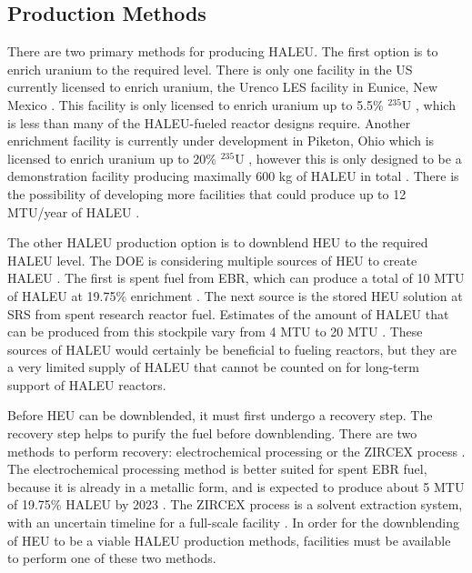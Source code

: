 \subsection{Production Methods}
There are two primary methods for producing \gls{HALEU}. The first 
option is to enrich uranium to the required level. There is only one 
facility in the US currently 
licensed to enrich uranium, the Urenco LES facility in Eunice, 
New Mexico \cite{nuclear_energy_institute_establishing_2022}. This facility is only 
licensed to enrich uranium up to 5.5\% $^{235}$U 
\cite{nuclear_energy_institute_establishing_2022},
which is less than many of the \gls{HALEU}-fueled reactor designs 
require. Another enrichment facility is currently under development in 
Piketon, Ohio which is licensed to enrich uranium up to 20\% 
$^{235}$U \cite{nuclear_energy_institute_establishing_2022}, however this is only 
designed to be a demonstration facility producing maximally 600 kg of 
\gls{HALEU} in total \cite{us_nuclear_regulatory_commission_centrus_2021}.
There is the possibility of developing more facilities that could produce up 
to 12 MTU/year of \gls{HALEU} \cite{nuclear_energy_institute_establishing_2022}.

The other \gls{HALEU} production option is to downblend \gls{HEU} to 
the required \gls{HALEU}
level. The \gls{DOE} is considering multiple sources of \gls{HEU} 
to create \gls{HALEU} \cite{nuclear_energy_institute_establishing_2022}. The 
first is spent fuel from \gls{EBR}, which can produce a total of 10 MTU 
of \gls{HALEU} at 19.75\% enrichment \cite{nuclear_energy_institute_establishing_2022}. 
The next source is the stored \gls{HEU} solution at \gls{SRS} from 
spent research reactor fuel. Estimates of the amount of \gls{HALEU}
that can be produced from this stockpile vary from 4 MTU 
\cite{nuclear_energy_institute_establishing_2022} to 20 MTU \cite{regalbuto_addressing_2020}.
These sources of 
\gls{HALEU} would certainly be beneficial to fueling reactors, but they 
are a very limited supply of \gls{HALEU} that cannot be counted on 
for long-term support of \gls{HALEU} reactors.

Before \gls{HEU} can be downblended, it must first undergo a recovery step. 
The recovery step helps to purify the fuel before downblending. There 
are two methods to perform recovery: electrochemical processing or 
the ZIRCEX process \cite{herczeg_high-assay_2019}. The electrochemical 
processing method is better suited for spent \gls{EBR} fuel, because it is 
already in a metallic form, and is expected to produce about 5 MTU of 
19.75\% \gls{HALEU} by 2023 \cite{herczeg_high-assay_2019}. The ZIRCEX 
process is a solvent extraction system, with an uncertain timeline 
for a full-scale facility \cite{herczeg_high-assay_2019}. In order for
the downblending of \gls{HEU} to be a viable \gls{HALEU} production 
methods, facilities must be available to perform one of these two methods. 


